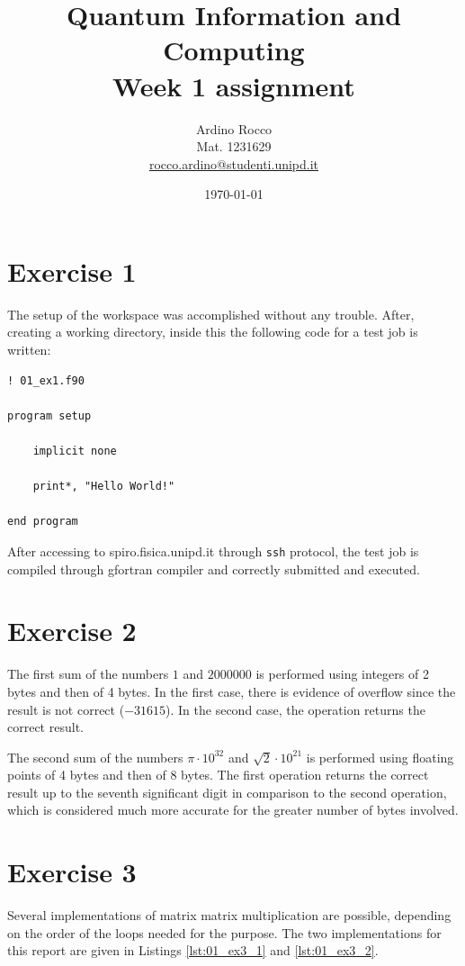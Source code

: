 \documentclass[a4paper]{article}
\title{\textbf{\huge Quantum Information and Computing}\\Week 1 assignment}
\author{Ardino Rocco\\Mat. 1231629\\\href{mailto:rocco.ardino@studenti.unipd.it}{rocco.ardino@studenti.unipd.it}}
\date{\today}
\begin{document}
\maketitle
\vspace{1cm}


\section*{Exercise 1}
The setup of the workspace was accomplished without any trouble. After, creating a working directory, inside this the following code for a test job is written:

\begin{lstlisting}[label={lst:01_ex1_1},caption={Test job submitted.}]
! 01_ex1.f90

program setup

	implicit none

	print*, "Hello World!"

end program
\end{lstlisting}

After accessing to spiro.fisica.unipd.it through \texttt{ssh} protocol, the test job is compiled through gfortran compiler and correctly submitted and executed.





\section*{Exercise 2}
The first sum of the numbers \( 1 \) and \( 2000000 \) is performed using integers of 2 bytes and then of 4 bytes. In the first case, there is evidence of overflow since the result is not correct (\( -31615 \)). In the second case, the operation returns the correct result.

The second sum of the numbers \( \pi \cdot 10^{32} \) and \( \sqrt{2} \cdot 10^{21} \) is performed using floating points of 4 bytes and then of 8 bytes. The first operation returns the correct result up to the seventh significant digit in comparison to the second operation, which is considered much more accurate for the greater number of bytes involved.





\section*{Exercise 3}
Several implementations of matrix matrix multiplication are possible, depending on the order of the loops needed for the purpose. The two implementations for this report are given in Listings \ref{lst:01_ex3_1} and \ref{lst:01_ex3_2}.
\end{document}
